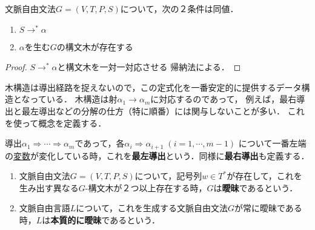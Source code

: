\begin{theorem}[導出関係の木構造による定式化]
    文脈自由文法$G=(V,T,P,S)$について，次の２条件は同値．
    \begin{enumerate}
        \item $S\rightarrow^*\alpha$
        \item $\alpha$を生む$G$の構文木が存在する
    \end{enumerate}
\end{theorem}
\begin{proof}
    $S\rightarrow^*\alpha$と構文木を一対一対応させる
    帰納法による．
\end{proof}
\begin{remarks}
    木構造は導出経路を捉えないので，この定式化を一番安定的に提供するデータ構造となっている．
    木構造は射$\alpha_1\to\alpha_m$に対応するのであって，
    例えば，最右導出と最左導出などの分解の仕方（特に順番）には関与しないことが多い．
    これを使って概念を定義する．
\end{remarks}

\begin{definition}
    導出$\alpha_1\Rightarrow\cdots\Rightarrow\alpha_m$であって，各$\alpha_i\Rightarrow\alpha_{i+1}\;(i=1,\cdots,m-1)$
    について一番左端の\underline{変数}が変化している時，これを\textbf{最左導出}という．同様に\textbf{最右導出}も定義する．
\end{definition}

\begin{definition}\mbox{}
    \begin{enumerate}
        \item 文脈自由文法$G=(V,T,P,S)$について，記号列$w\in T^*$が存在して，これを生み出す異なる$G$-構文木が２つ以上存在する時，$G$は\textbf{曖昧}であるという．
        \item 文脈自由言語$L$について，これを生成する文脈自由文法$G$が常に曖昧である時，$L$は\textbf{本質的に曖昧}であるという．
    \end{enumerate}
\end{definition}

